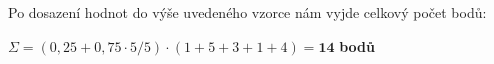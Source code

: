 \documentclass[12pt, a4paper]{article}
\begin{document}
    Po dosazení hodnot do výše uvedeného vzorce nám vyjde celkový počet bodů:\newline
    \begin{center}
        $\Sigma = (0,25 + 0,75 \cdot 5/5) \cdot (1 + 5 + 3 + 1 + 4) = \bm{14}$ \textbf{bodů}
    \end{center}
	\clearpage
	
	\renewcommand{\refname}{Použitá literatura}
	
\end{document}
